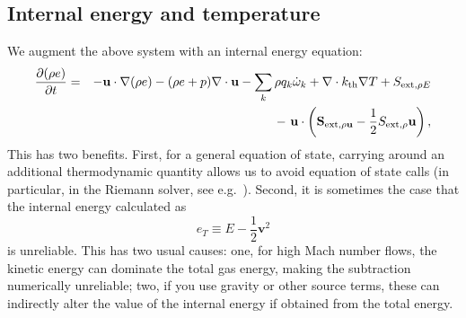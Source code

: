 \subsection{Internal energy and temperature}

We augment the above system with an internal energy equation:
\begin{eqnarray}
\frac{\partial(\rho e)}{\partial t} &=& - {\bf u}\cdot\nabla(\rho e) - (\rho e+p)\nabla\cdot{\bf u} - \sum_k \rho q_k\dot\omega_k 
                                        + \nabla\cdot{k_\mathrm{th}}\nabla T + S_{{\rm ext},\rho E} \nonumber\\
&& -\  {\bf u}\cdot\left({\bf S}_{{\rm ext},\rho{\bf u}}-\frac{1}{2}S_{{\rm ext},\rho}{\bf u}\right), 
\end{eqnarray}
This has two benefits. First, for a general equation of state,
carrying around an additional thermodynamic quantity allows us to
avoid equation of state calls (in particular, in the Riemann solver,
see e.g.~\cite{colglaz}). Second, it is sometimes the case that the
internal energy calculated as 
\begin{equation}
e_T \equiv E - \frac{1}{2} \mathbf{v}^2
\end{equation}
 is
unreliable.  This has two usual causes: one, for high Mach number
flows, the kinetic energy can dominate the total gas energy, making
the subtraction numerically unreliable; two, if you use gravity or
other source terms, these can indirectly alter the value of the
internal energy if obtained from the total energy. 

